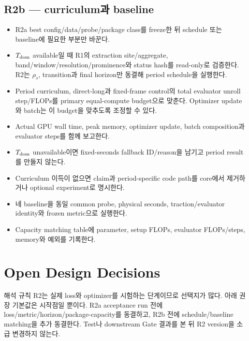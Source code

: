 \documentclass[10pt]{article}
\begin{document}
\subsection{R2b --- curriculum과 baseline}

\begin{itemize}
  \item[$\square$] R2a best config/data/probe/package class를 freeze한 뒤 schedule 또는 baseline에 필요한 부분만 바꾼다.
  \item[$\square$] \(T_{\rm dom}\) available일 때 R1의 extraction site/aggregate,
  band/window/resolution/prominence와 status hash를 read-only로 검증한다.
  R2는 \(\rho_s\), transition과 final horizon만 동결해 period schedule을 실행한다.
  \item[$\square$] Period curriculum, direct-long과 fixed-frame control의 total evaluator unroll step/FLOPs를
  primary equal-compute budget으로 맞춘다. Optimizer update와 batch는 이 budget을 맞추도록 조정할 수 있다.
  \item[$\square$] Actual GPU wall time, peak memory, optimizer update, batch composition과 evaluator steps를 함께 보고한다.
  \item[$\square$] \(T_{\rm dom}\) unavailable이면 fixed-seconds fallback ID/reason을 남기고 period result를 만들지 않는다.
  \item[$\square$] Curriculum 이득이 없으면 claim과 period-specific code path를 core에서 제거하거나 optional experiment로 명시한다.
  \item[$\square$] 네 baseline을 동일 common probe, physical seconds, traction/evaluator identity와 frozen metric으로 실행한다.
  \item[$\square$] Capacity matching table에 parameter, setup FLOPs, evaluator FLOPs/steps, memory와 예외를 기록한다.
\end{itemize}

\section{Open Design Decisions}
\label{sec:r2-chapter-5}

\begin{decisionbox}{해석 규칙}
R2는 실제 loss와 optimizer를 시험하는 단계이므로 선택지가 많다. 아래 권장 기본값은 시작점일 뿐이다.
R2a acceptance run 전에 loss/metric/horizon/package-capacity를 동결하고, R2b 전에 schedule/baseline matching을
추가 동결한다. Test나 downstream Gate 결과를 본 뒤 R2 version을 소급 변경하지 않는다.
\end{decisionbox}
\end{document}
